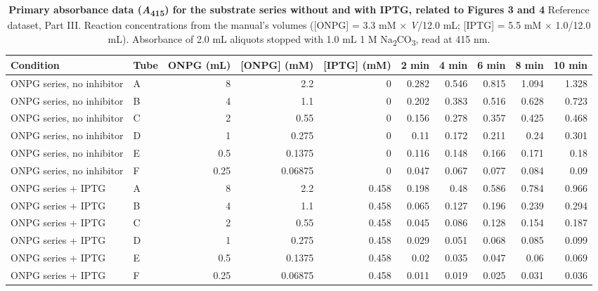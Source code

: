 \documentclass[9pt,twocolumn]{extarticle}
\newcommand{\Aa}{\textit{A}\textsubscript{415}}
\begin{document}
\begin{table}[h]
\caption{\textbf{Primary absorbance data (\Aa) for the substrate series without and with IPTG, related to Figures 3 and 4}\newline
Reference dataset, Part III. Reaction concentrations from the manual's volumes ([ONPG] = 3.3 mM × \textit{V}/12.0 mL; [IPTG] = 5.5 mM × 1.0/12.0 mL). Absorbance of 2.0 mL aliquots stopped with 1.0 mL 1 M Na\textsubscript{2}CO\textsubscript{3}, read at 415 nm.}
\footnotesize
\begin{tabular}{@{}llrrrrrrrr@{}}
\toprule
Condition & Tube & ONPG (mL) & [ONPG] (mM) & [IPTG] (mM) & 2 min & 4 min & 6 min & 8 min & 10 min \\
\midrule
ONPG series, no inhibitor & A & 8 & 2.2 & 0 & 0.282 & 0.546 & 0.815 & 1.094 & 1.328 \\
ONPG series, no inhibitor & B & 4 & 1.1 & 0 & 0.202 & 0.383 & 0.516 & 0.628 & 0.723 \\
ONPG series, no inhibitor & C & 2 & 0.55 & 0 & 0.156 & 0.278 & 0.357 & 0.425 & 0.468 \\
ONPG series, no inhibitor & D & 1 & 0.275 & 0 & 0.11 & 0.172 & 0.211 & 0.24 & 0.301 \\
ONPG series, no inhibitor & E & 0.5 & 0.1375 & 0 & 0.116 & 0.148 & 0.166 & 0.171 & 0.18 \\
ONPG series, no inhibitor & F & 0.25 & 0.06875 & 0 & 0.047 & 0.067 & 0.077 & 0.084 & 0.09 \\
ONPG series + IPTG & A & 8 & 2.2 & 0.458 & 0.198 & 0.48 & 0.586 & 0.784 & 0.966 \\
ONPG series + IPTG & B & 4 & 1.1 & 0.458 & 0.065 & 0.127 & 0.196 & 0.239 & 0.294 \\
ONPG series + IPTG & C & 2 & 0.55 & 0.458 & 0.045 & 0.086 & 0.128 & 0.154 & 0.187 \\
ONPG series + IPTG & D & 1 & 0.275 & 0.458 & 0.029 & 0.051 & 0.068 & 0.085 & 0.099 \\
ONPG series + IPTG & E & 0.5 & 0.1375 & 0.458 & 0.02 & 0.035 & 0.047 & 0.06 & 0.069 \\
ONPG series + IPTG & F & 0.25 & 0.06875 & 0.458 & 0.011 & 0.019 & 0.025 & 0.031 & 0.036 \\
\bottomrule
\end{tabular}
\end{table}
\end{document}
